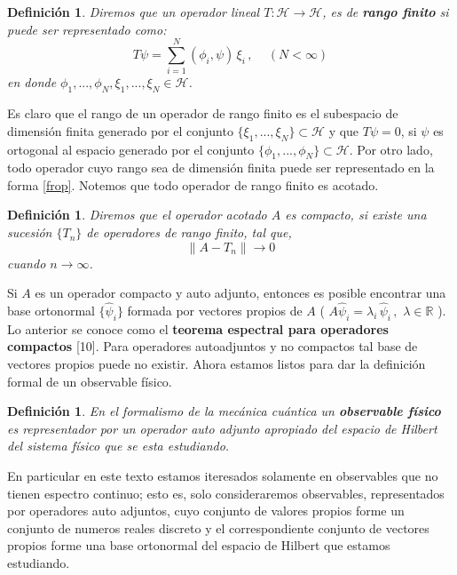 \documentclass[12pt]{book}
\numberwithin{equation}{chapter}
\newtheorem{definition}[theorem]{Definici\'on}
\def\R{\mathbb{R}}
\def\rar{\rightarrow}
\def\H{\mathcal{H}}
\def\hpsi{\hat{\psi}}
\begin{document}
\begin{definition}
Diremos que un operador lineal $T: \H \rar \H$, es de {\bf rango finito} si puede ser representado como:
\begin{equation}\label{frop}
T \psi = \sum_{i=1}^{N} ( \phi_{i},\psi )\, \xi_{i} \,,\,\,\,\,\,\,\, (N <\infty)
\end{equation}
en donde $ \phi_{1},...,\phi_{N},\xi_{1},...,\xi_{N} \in \H $.
\end{definition}

Es claro que el rango de un operador de rango finito es el subespacio de dimensi\'on finita generado por el conjunto $\{ \xi_{1},...,\xi_{N} \} \subset \H$ y que $T\psi =0$, si $\psi$ es ortogonal al espacio generado por el conjunto $\{ \phi_{1},...,\phi_{N} \} \subset \H$. Por otro lado, todo operador cuyo rango sea de dimensi\'on finita puede ser representado en la forma \eqref{frop}. Notemos que todo operador de rango finito es acotado. 

\begin{definition}
Diremos que el operador acotado $A$ es compacto, si existe una sucesi\'on $\{ T_{n} \}$ de operadores de rango finito, tal que, 
$$ \| A - T_{n} \| \rar 0 $$
cuando $n \rar \infty$.
\end{definition}

Si $A$ es un operador compacto y auto adjunto, entonces es posible encontrar una base ortonormal $\{ \hpsi_{i} \}$ formada por vectores propios de $A$ ( $A\hpsi_{i}= \lambda_{i}\, \hpsi_{i} \,,\,\, \lambda \in \R$ ). Lo anterior se conoce como el {\bf teorema espectral para operadores compactos} [10]. Para operadores autoadjuntos y no compactos tal base de vectores propios puede no existir. Ahora estamos listos para dar la definici\'on formal de un observable f\'isico.
\begin{definition}\label{obs}
En el formalismo de la mec\'anica cu\'antica un {\bf observable f\'isico} es representador por un operador auto adjunto apropiado del espacio de Hilbert del sistema f\'isico que se esta estudiando.
\end{definition}

En particular en este texto estamos iteresados solamente en observables que no tienen espectro continuo; esto es, solo consideraremos observables, representados por operadores auto adjuntos, cuyo conjunto de valores propios forme un conjunto de numeros reales discreto y el correspondiente conjunto de vectores propios forme una base ortonormal del espacio de Hilbert que estamos estudiando.
\end{document}
